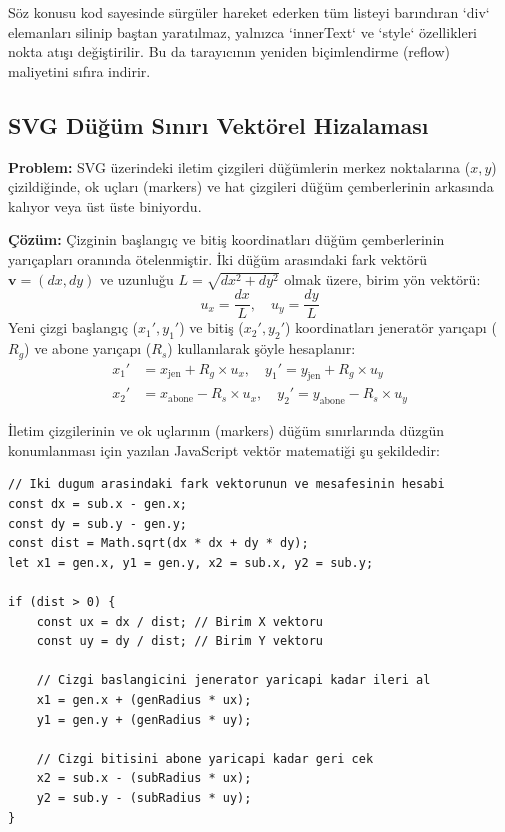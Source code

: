 \documentclass[12pt,a4paper]{article}
\begin{document}
Söz konusu kod sayesinde sürgüler hareket ederken tüm listeyi barındıran `div` elemanları silinip baştan yaratılmaz, yalnızca `innerText` ve `style` özellikleri nokta atışı değiştirilir. Bu da tarayıcının yeniden biçimlendirme (reflow) maliyetini sıfıra indirir.

\subsection{SVG Düğüm Sınırı Vektörel Hizalaması}
\textbf{Problem:} SVG üzerindeki iletim çizgileri düğümlerin merkez noktalarına ($x, y$) çizildiğinde, ok uçları (markers) ve hat çizgileri düğüm çemberlerinin arkasında kalıyor veya üst üste biniyordu.

\textbf{Çözüm:} Çizginin başlangıç ve bitiş koordinatları düğüm çemberlerinin yarıçapları oranında ötelenmiştir. İki düğüm arasındaki fark vektörü $\mathbf{v} = (dx, dy)$ ve uzunluğu $L = \sqrt{dx^2 + dy^2}$ olmak üzere, birim yön vektörü:
\begin{equation}
    u_x = \frac{dx}{L}, \quad u_y = \frac{dy}{L}
\end{equation}
Yeni çizgi başlangıç ($x_1', y_1'$) ve bitiş ($x_2', y_2'$) koordinatları jeneratör yarıçapı ($R_g$) ve abone yarıçapı ($R_s$) kullanılarak şöyle hesaplanır:
\begin{align}
    x_1' &= x_{\text{jen}} + R_g \times u_x, \quad y_1' = y_{\text{jen}} + R_g \times u_y \\
    x_2' &= x_{\text{abone}} - R_s \times u_x, \quad y_2' = y_{\text{abone}} - R_s \times u_y
\end{align}

İletim çizgilerinin ve ok uçlarının (markers) düğüm sınırlarında düzgün konumlanması için yazılan JavaScript vektör matematiği şu şekildedir:

\begin{lstlisting}[language=HTML, caption={dashboard.html - Vektorel Sinir Oteleme Matematigi}]
// Iki dugum arasindaki fark vektorunun ve mesafesinin hesabi
const dx = sub.x - gen.x;
const dy = sub.y - gen.y;
const dist = Math.sqrt(dx * dx + dy * dy);
let x1 = gen.x, y1 = gen.y, x2 = sub.x, y2 = sub.y;

if (dist > 0) {
    const ux = dx / dist; // Birim X vektoru
    const uy = dy / dist; // Birim Y vektoru
    
    // Cizgi baslangicini jenerator yaricapi kadar ileri al
    x1 = gen.x + (genRadius * ux);
    y1 = gen.y + (genRadius * uy);
    
    // Cizgi bitisini abone yaricapi kadar geri cek
    x2 = sub.x - (subRadius * ux);
    y2 = sub.y - (subRadius * uy);
}
\end{lstlisting}
\end{document}
